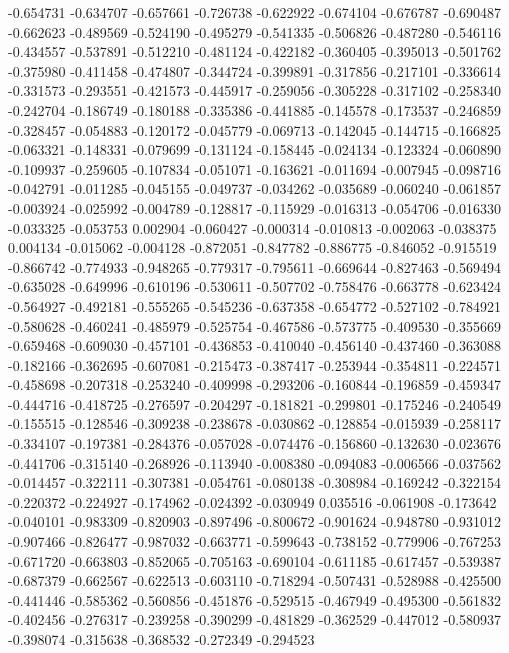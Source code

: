 -0.654731
-0.634707
-0.657661
-0.726738
-0.622922
-0.674104
-0.676787
-0.690487
-0.662623
-0.489569
-0.524190
-0.495279
-0.541335
-0.506826
-0.487280
-0.546116
-0.434557
-0.537891
-0.512210
-0.481124
-0.422182
-0.360405
-0.395013
-0.501762
-0.375980
-0.411458
-0.474807
-0.344724
-0.399891
-0.317856
-0.217101
-0.336614
-0.331573
-0.293551
-0.421573
-0.445917
-0.259056
-0.305228
-0.317102
-0.258340
-0.242704
-0.186749
-0.180188
-0.335386
-0.441885
-0.145578
-0.173537
-0.246859
-0.328457
-0.054883
-0.120172
-0.045779
-0.069713
-0.142045
-0.144715
-0.166825
-0.063321
-0.148331
-0.079699
-0.131124
-0.158445
-0.024134
-0.123324
-0.060890
-0.109937
-0.259605
-0.107834
-0.051071
-0.163621
-0.011694
-0.007945
-0.098716
-0.042791
-0.011285
-0.045155
-0.049737
-0.034262
-0.035689
-0.060240
-0.061857
-0.003924
-0.025992
-0.004789
-0.128817
-0.115929
-0.016313
-0.054706
-0.016330
-0.033325
-0.053753
0.002904
-0.060427
-0.000314
-0.010813
-0.002063
-0.038375
0.004134
-0.015062
-0.004128
-0.872051
-0.847782
-0.886775
-0.846052
-0.915519
-0.866742
-0.774933
-0.948265
-0.779317
-0.795611
-0.669644
-0.827463
-0.569494
-0.635028
-0.649996
-0.610196
-0.530611
-0.507702
-0.758476
-0.663778
-0.623424
-0.564927
-0.492181
-0.555265
-0.545236
-0.637358
-0.654772
-0.527102
-0.784921
-0.580628
-0.460241
-0.485979
-0.525754
-0.467586
-0.573775
-0.409530
-0.355669
-0.659468
-0.609030
-0.457101
-0.436853
-0.410040
-0.456140
-0.437460
-0.363088
-0.182166
-0.362695
-0.607081
-0.215473
-0.387417
-0.253944
-0.354811
-0.224571
-0.458698
-0.207318
-0.253240
-0.409998
-0.293206
-0.160844
-0.196859
-0.459347
-0.444716
-0.418725
-0.276597
-0.204297
-0.181821
-0.299801
-0.175246
-0.240549
-0.155515
-0.128546
-0.309238
-0.238678
-0.030862
-0.128854
-0.015939
-0.258117
-0.334107
-0.197381
-0.284376
-0.057028
-0.074476
-0.156860
-0.132630
-0.023676
-0.441706
-0.315140
-0.268926
-0.113940
-0.008380
-0.094083
-0.006566
-0.037562
-0.014457
-0.322111
-0.307381
-0.054761
-0.080138
-0.308984
-0.169242
-0.322154
-0.220372
-0.224927
-0.174962
-0.024392
-0.030949
0.035516
-0.061908
-0.173642
-0.040101
-0.983309
-0.820903
-0.897496
-0.800672
-0.901624
-0.948780
-0.931012
-0.907466
-0.826477
-0.987032
-0.663771
-0.599643
-0.738152
-0.779906
-0.767253
-0.671720
-0.663803
-0.852065
-0.705163
-0.690104
-0.611185
-0.617457
-0.539387
-0.687379
-0.662567
-0.622513
-0.603110
-0.718294
-0.507431
-0.528988
-0.425500
-0.441446
-0.585362
-0.560856
-0.451876
-0.529515
-0.467949
-0.495300
-0.561832
-0.402456
-0.276317
-0.239258
-0.390299
-0.481829
-0.362529
-0.447012
-0.580937
-0.398074
-0.315638
-0.368532
-0.272349
-0.294523
